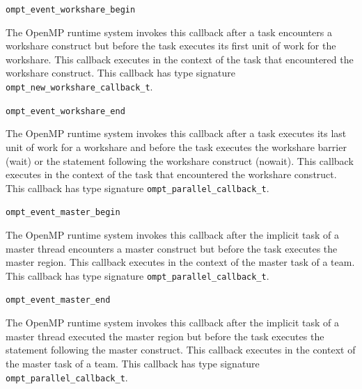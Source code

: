 \documentclass{article}
\newcommand{\descheader}[1]{{\needspace{3\baselineskip}\vspace{1em}\noindent \fbox{#1}}}
\begin{document}
\begin{description}

\item \verb|ompt_event_workshare_begin|

The OpenMP runtime system invokes this callback after a task encounters a workshare construct but before the task executes its first unit of work for the workshare. This callback executes in the context of the task that encountered the workshare construct. This callback has type signature \verb|ompt_new_workshare_callback_t|.

\item \verb|ompt_event_workshare_end|

The OpenMP runtime system invokes this callback after a task executes its last unit of work for a workshare and before the task executes the workshare barrier (wait) or the statement following the workshare construct (nowait). This callback executes in the context of the task that encountered the workshare construct.  This callback has type signature \verb|ompt_parallel_callback_t|.

\end{description}

\descheader{Master Blocks}

\begin{description}
 
\item \verb|ompt_event_master_begin|

  The OpenMP runtime system invokes this callback after the implicit task of a master thread encounters a master construct but
before the task
  executes the master region. This callback executes in the context of
  the master task of a team.
  This callback has type signature \verb|ompt_parallel_callback_t|. 

\item \verb|ompt_event_master_end|

  The OpenMP runtime system invokes this callback after the implicit task of a master thread executed the master region 
 but before the task executes the statement
  following the master construct. This callback executes in the
  context of the master task of a  team.
  This callback has type signature \verb|ompt_parallel_callback_t|. 

\end{description}

\descheader{Target Devices}
\end{document}
